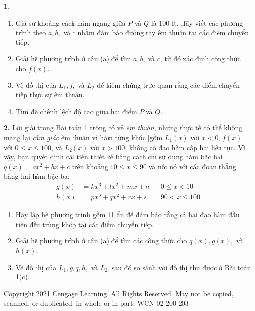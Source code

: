 \begin{tcolorbox}[
  enhanced,
  colback=projectbg,
  colframe=bordergreen,
  boxrule=0.6pt,
  arc=0mm,
  left=8pt, right=8pt, top=6pt, bottom=8pt
]
\begin{minipage}[t]{0.66\textwidth}
{    \vspace{5pt}
    \noindent\textbf{1.} 
    \begin{enumerate}[label=(\alph*), leftmargin=*, itemsep=2pt, topsep=1pt]
      \item Giả sử khoảng cách nằm ngang giữa $P$ và $Q$ là $100\text{ ft}$. Hãy viết các phương trình theo $a, b,$ và $c$ nhằm đảm bảo đường ray êm thuận tại các điểm chuyển tiếp.
      \item Giải hệ phương trình ở câu (a) để tìm $a, b,$ và $c$, từ đó xác định công thức cho $f(x)$.
      \item \graphicon\; Vẽ đồ thị của $L_1, f,$ và $L_2$ để kiểm chứng trực quan rằng các điểm chuyển tiếp thực sự êm thuận.
      \item Tìm độ chênh lệch độ cao giữa hai điểm $P$ và $Q$.
    \end{enumerate}

    \vspace{4pt}
    \noindent\textbf{2.} 
    Lời giải trong Bài toán 1 trông có vẻ \emph{êm thuận}, nhưng thực tế có thể không mang lại \emph{cảm giác} êm thuận vì hàm từng khúc [gồm $L_1(x)$ với $x < 0$, $f(x)$ với $0 \le x \le 100$, và $L_2(x)$ với $x > 100$] không có đạo hàm cấp hai liên tục. Vì vậy, bạn quyết định cải tiến thiết kế bằng cách chỉ sử dụng hàm bậc hai $q(x) = ax^2 + bx + c$ trên khoảng $10 \le x \le 90$ và nối nó với các đoạn thẳng bằng hai hàm bậc ba:
    \[
    \begin{aligned}
      g(x) &= kx^3 + lx^2 + mx + n && 0 \le x < 10 \\
      h(x) &= px^3 + qx^2 + rx + s && 90 < x \le 100
    \end{aligned}
    \]
    \begin{enumerate}[label=(\alph*), leftmargin=*, itemsep=2pt, topsep=1pt]
      \item Hãy lập hệ phương trình gồm 11 ẩn để đảm bảo rằng cả hai đạo hàm đầu tiên đều trùng khớp tại các điểm chuyển tiếp.
      \item \techicon\; Giải hệ phương trình ở câu (a) để tìm các công thức cho $q(x), g(x),$ và $h(x)$.
      \item Vẽ đồ thị của $L_1, g, q, h,$ và $L_2$, sau đó so sánh với đồ thị thu được ở Bài toán 1(c).
    \end{enumerate}
    }
  \end{minipage}
\end{tcolorbox}

\vfill
\noindent
\begin{center}
  \fontsize{5}{6}\selectfont\color{gray!80!black}
  Copyright 2021 Cengage Learning. All Rights Reserved. May not be copied, scanned, or duplicated, in whole or in part. WCN 02-200-203
\end{center}
